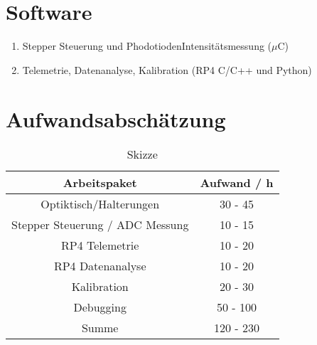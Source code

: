 \section*{Software}
\begin{enumerate}
    \item Stepper Steuerung und PhodotiodenIntensitätsmessung ($\mu$C)
    \item Telemetrie, Datenanalyse, Kalibration (RP4 C/C++ und Python)
\end{enumerate}

\section*{Aufwandsabschätzung}
\begin{table}[H]
    \centering
    \caption{
        Skizze
    }
    \begin{tabular}{| c | c |}
        \hline
        Arbeitspaket &  Aufwand / h\\
        \hline
        Optiktisch/Halterungen & 30 - 45  \\
        \hline
        Stepper Steuerung / ADC Messung & 10 - 15 \\
        \hline
        RP4 Telemetrie & 10 - 20  \\
        \hline
        RP4 Datenanalyse & 10 - 20  \\
        \hline
        Kalibration & 20 - 30 \\
        \hline
        Debugging & 50 - 100 \\
        \hline
        \hline
        Summe & 120 - 230  \\
        \hline
    \end{tabular}
    \label{tab:Aufwand}
\end{table}